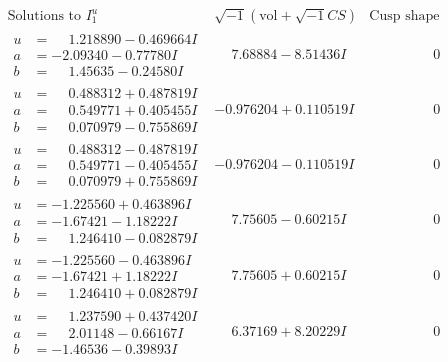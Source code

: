 \documentclass[1p]{elsarticle_modified}
\theoremstyle{definition}
\newcommand{\I}{\sqrt{-1}}
\begin{document}
$$\begin{array}{c|c|c}
\text{Solutions to }I^u_{1}& \I (\text{vol} + \sqrt{-1}CS) & \text{Cusp shape}\\
 \hline 
\begin{aligned}
u &= \phantom{-}1.218890 - 0.469664 I \\
a &= -2.09340 - 0.77780 I \\
b &= \phantom{-}1.45635 - 0.24580 I\end{aligned}
 & \phantom{-}7.68884 - 8.51436 I & \phantom{-0.000000 } 0 \\ \hline\begin{aligned}
u &= \phantom{-}0.488312 + 0.487819 I \\
a &= \phantom{-}0.549771 + 0.405455 I \\
b &= \phantom{-}0.070979 - 0.755869 I\end{aligned}
 & -0.976204 + 0.110519 I & \phantom{-0.000000 } 0 \\ \hline\begin{aligned}
u &= \phantom{-}0.488312 - 0.487819 I \\
a &= \phantom{-}0.549771 - 0.405455 I \\
b &= \phantom{-}0.070979 + 0.755869 I\end{aligned}
 & -0.976204 - 0.110519 I & \phantom{-0.000000 } 0 \\ \hline\begin{aligned}
u &= -1.225560 + 0.463896 I \\
a &= -1.67421 - 1.18222 I \\
b &= \phantom{-}1.246410 - 0.082879 I\end{aligned}
 & \phantom{-}7.75605 - 0.60215 I & \phantom{-0.000000 } 0 \\ \hline\begin{aligned}
u &= -1.225560 - 0.463896 I \\
a &= -1.67421 + 1.18222 I \\
b &= \phantom{-}1.246410 + 0.082879 I\end{aligned}
 & \phantom{-}7.75605 + 0.60215 I & \phantom{-0.000000 } 0 \\ \hline\begin{aligned}
u &= \phantom{-}1.237590 + 0.437420 I \\
a &= \phantom{-}2.01148 - 0.66167 I \\
b &= -1.46536 - 0.39893 I\end{aligned}
 & \phantom{-}6.37169 + 8.20229 I & \phantom{-0.000000 } 0 \\ \hline\begin{aligned}

\end{aligned}
\end{array}$$
\end{document}
